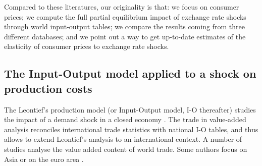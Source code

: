 \documentclass[11pt,a4paper]{article}
\begin{document}
Compared to these literatures, our originality is that: we focus on consumer prices; we compute the full partial equilibrium impact of exchange rate shocks through world input-output tables; we compare the results coming from three different databases; and we point out a way to get up-to-date estimates of the elasticity of consumer prices to exchange rate shocks.



\subsection{The Input-Output model applied to a shock on production costs} 
\label{subsec:io}
The Leontief's production model (or Input-Output model, I-O thereafter) studies the impact of a demand shock in a closed economy \citep{Leontief1951}. 
The trade in value-added analysis reconciles international trade statistics with national I-O tables, and thus allows to extend Leontief's analysis to an international context.
A number of studies \citep{Hummels2001,Daudin2006,Daudin2011, DeBacker2012,Johnson2012,Koopman2014, Amador2015,Los2016} analyse the value added content of world trade. Some authors focus on Asia \citep{Sato2014} or on the euro area \citep{Cappariello2015}.
\end{document}
